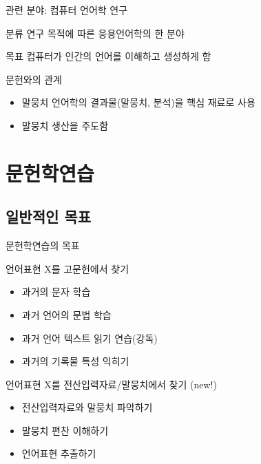 \documentclass[11pt, aspectratio=169]{beamer}
\begin{document}
\begin{frame}[t]{관련 분야: 컴퓨터 언어학 연구}
  \begin{block}{분류}
    연구 목적에 따른 응용언어학의 한 분야
  \end{block}

  \begin{block}{목표}
    컴퓨터가 인간의 언어를 이해하고 생성하게 함
  \end{block}

  \begin{block}{문헌와의 관계}
    \begin{itemize}
      \item 말뭉치 언어학의 결과물(말뭉치, 분석)을 핵심 재료로 사용
      \item 말뭉치 생산을 주도함
    \end{itemize}
  \end{block}

\end{frame}


\section{문헌학연습}

\subsection{일반적인 목표}

\begin{frame}{문헌학연습의 목표}
  \begin{block}{언어표현 X를 고문헌에서 찾기}
    \begin{itemize}
      \item 과거의 문자 학습
      \item 과거 언어의 문법 학습
      \item 과거 언어 텍스트 읽기 연습(강독)
      \item 과거의 기록물 특성 익히기        
    \end{itemize}    
  \end{block}

  \begin{block}{언어표현 X를 전산입력자료/말뭉치에서 찾기 (new!)}
    \begin{itemize}
      \item 전산입력자료와 말뭉치 파악하기
      \item 말뭉치 편찬 이해하기
      \item 언어표현 추출하기
    \end{itemize}    
  \end{block}
\end{frame}
\end{document}

